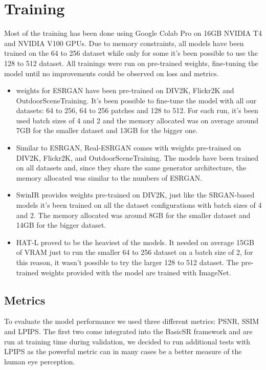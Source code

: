 \newpage
\chapter{Training}
\label{cha:Training}

Most of the training has been done using Google Colab Pro on 16GB NVIDIA T4 and NVIDIA V100 GPUs. Due to memory constraints, all models have been trained on the 64 to 256 dataset while only for some it's been possible to use the 128 to 512 dataset.
All trainings were run on pre-trained weights, fine-tuning the model until no improvements could be observed on loss and metrics.

\begin{itemize}
  \item weights for ESRGAN have been pre-trained on  DIV2K\cite{Agustsson_2017_CVPR_Workshops}, Flickr2K\cite{Lim_2017_CVPR_Workshops} and OutdoorSceneTraining\cite{wang2018recovering}. It's been possible to fine-tune the model with all our datasets: 64 to 256, 64 to 256 patches and 128 to 512. For each run, it's been used batch sizes of 4 and 2 and the memory allocated was on average around 7GB for the smaller dataset and 13GB for the bigger one.
  \item Similar to ESRGAN, Real-ESRGAN comes with weights pre-trained on DIV2K, Flickr2K, and OutdoorSceneTraining. The models have been trained on all datasets and, since they share the same generator architecture, the memory allocated was similar to the numbers of ESRGAN.
  \item SwinIR provides weights pre-trained on DIV2K, just like the SRGAN-based models it's been trained on all the dataset configurations with batch sizes of 4 and 2. The memory allocated was around 8GB for the smaller dataset and 14GB for the bigger dataset.
  \item HAT-L proved to be the heaviest of the models. It needed on average 15GB of VRAM just to run the smaller 64 to 256 dataset on a batch size of 2, for this reason, it wasn't possible to try the larger 128 to 512 dataset. The pre-trained weights provided with the model are trained with ImageNet\cite{deng2009imagenet}.
\end{itemize}

\section{Metrics}
\label{sec:metrics}

To evaluate the model performance we used three different metrics: PSNR, SSIM and LPIPS. The first two come integrated into the BasicSR framework and are run at training time during validation, we decided to run additional tests with LPIPS as the powerful metric can in many cases be a better measure of the human eye perception.

